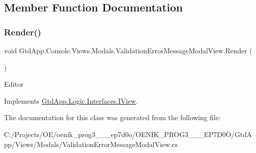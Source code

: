 \subsection{Member Function Documentation}
\mbox{\label{class_gtd_app_1_1_console_1_1_views_1_1_modals_1_1_validation_error_message_modal_view_a2767ee2bc35f1897b498241d4dbf79fe}} 
\subsubsection{\texorpdfstring{Render()}{Render()}}
{\footnotesize\ttfamily void Gtd\+App.\+Console.\+Views.\+Modals.\+Validation\+Error\+Message\+Modal\+View.\+Render (\begin{DoxyParamCaption}{ }\end{DoxyParamCaption})}



Editor 



Implements \mbox{\hyperlink{interface_gtd_app_1_1_logic_1_1_interfaces_1_1_i_view_a38544ad3bed7acb83711278dd38a33e8}{Gtd\+App.\+Logic.\+Interfaces.\+I\+View}}.



The documentation for this class was generated from the following file\+:\begin{DoxyCompactItemize}
\item 
C\+:/\+Projects/\+O\+E/oenik\+\_\+prog3\+\_\+\_\+\_\+ep7d0o/\+O\+E\+N\+I\+K\+\_\+\+P\+R\+O\+G3\+\_\+\_\+\_\+\+E\+P7\+D0\+O/\+Gtd\+App/\+Views/\+Modals/Validation\+Error\+Message\+Modal\+View.\+cs\end{DoxyCompactItemize}
